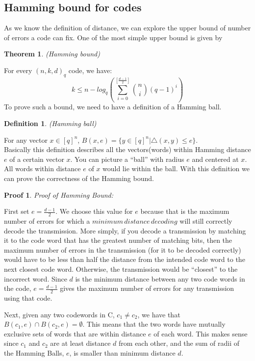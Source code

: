 \documentclass{article}
\newtheorem{Definition}{Definition}
\newtheorem{Theorem}{Theorem}
\newtheorem{Proof}{Proof}
\begin{document}
\subsection{Hamming bound for codes}
As we know the definition of distance, we can explore the upper bound of number of errors a code can fix. One of the most simple upper bound is given by
\begin{Theorem}(Hamming bound)\end{Theorem}
\noindent For every $(n,k,d)_{q}$ code, we have:
\begin{equation}
k \le n - log_q(\sum_{i=0}^{[\frac{d-1}{2}]}{n \choose i} (q-1)^i)
\end{equation}
To prove such a bound, we need to have a definition of a Hamming ball.
\begin{Definition}(Hamming ball)\end{Definition}
\noindent For any vector $x \in [q]^n$,
$B(x,e) = \{y \in [q]^n | \bigtriangleup (x,y) \le e\}$.\\
Basically this definition describes all the vectors(words) within Hamming distance $e$ of a certain vector $x$. You can picture a ``ball'' with radius $e$ and centered at $x$. All words within distance $e$ of $x$ would lie within the ball. With this definition we can prove the correctness of the Hamming bound.
\begin{Proof}Proof of Hamming Bound: \end{Proof} 
\noindent First set $e = \frac{d-1}{2}$. We choose this value for $e$ because that is the maximum number of errors for which a $minimum\, distance\, decoding$ will still correctly decode the transmission. More simply, if you decode a transmission by matching it to the code word that has the greatest number of matching bits, then the maximum number of errors in the transmission (for it to be decoded correctly) would have to be less than half the distance from the intended code word to the next closest code word. Otherwise, the transmission would be ``closest'' to the incorrect word. Since $d$ is the minimum distance between any two code words in the code,  $e = \frac{d-1}{2}$ gives the maximum number of errors for any transmission using that code. 

 Next, given any two codewords in C, $c_1 \neq c_2$, we have that $B(c_1,e) \cap B(c_2,e) = \emptyset$. This means that the two words have mutually exclusive sets of words that are within distance $e$ of each word. This makes sense since $c_1$ and $c_2$ are at least distance $d$ from each other, and the sum of radii of the Hamming Balls, $e$, is smaller than minimum distance $d$. 
\end{document}
